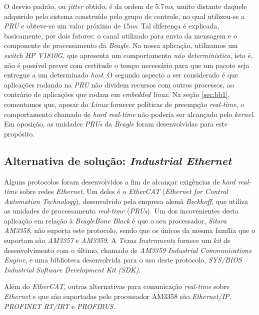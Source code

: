 O desvio padrão, ou \textit{jitter} obtido, é da ordem de 5.7\textit{ms}, muito
distante daquele adquirido pelo sistema construído pelo grupo de controle, no
qual utilizou-se a \textit{PRU} e obteve-se um valor próximo de 15\textit{ns}.
Tal diferença é explicada, basicamente, por dois fatores: o canal utilizado para
envio da mensagem e o componente de processamento da \textit{Beagle}. Na nossa
aplicação, utilizamos um \textit{switch HP V1810G}, que apresenta um
comportamento \textit{não deterministico}, isto é, não é possível prever com
certitude o tempo necessário para que um pacote seja entregue a um determinado
\textit{host}. O segundo aspecto a ser considerado é que aplicações rodando na
\textit{PRU} não dividem recursos com outros processos, ao contrário de
aplicações que rodam em \textit{embedded linux}. Na seção \ref{sec:bb1},
comentamos que, apesar do \textit{Linux} fornecer políticas de preempção
\textit{real-time}, o comportamento chamado de \textit{hard real-time} não
poderia ser alcançado pelo \textit{kernel}. Em oposição, as unidades
\textit{PRUs} da \textit{Beagle} foram desenvolvidas para este propósito.

\subsection{Alternativa de solução: \textit{Industrial Ethernet}}

Alguns protocolos foram desenvolvidos a fim de alcançar exigências de
\textit{hard real-time} sobre redes \textit{Ethernet}. Um deles é o
\textit{EtherCAT} (\textit{Ethernet for Control Automation Technology}),
desenvolvido pela empresa alemã \textit{Beckhoff}, que utiliza as unidades de
processamento \textit{real-time} (\textit{PRUs}). Um dos incovenientes desta
aplicação em relação à \textit{BeagleBone Black} é que o seu processador,
\textit{Sitara AM3358}, não suporta este protocolo, sendo que os únicos da mesma
família que o suportam são \textit{AM3357} e \textit{AM3359}. A \textit{Texas
Instruments} fornece um \textit{kit} de desenvolvimento com o último, chamado de
\textit{AM3359 Industrial Communications Engine}, e uma biblioteca desenvolvida
para o uso deste protocolo, \textit{SYS/BIOS Industrial Software Development Kit
(SDK)}.

\vspace{12pt}

Além do \textit{EtherCAT}, outras alternativas para comunicação
\textit{real-time} sobre \textit{Ethernet} e que são suportadas pelo processador
AM3358 são \textit{Ethernet/IP}, \textit{PROFINET RT/IRT} e \textit{PROFIBUS}.
